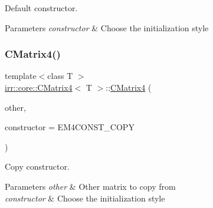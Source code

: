 Default constructor. 


\begin{DoxyParams}{Parameters}
{\em constructor} & Choose the initialization style \\
\hline
\end{DoxyParams}
\mbox{\label{classirr_1_1core_1_1CMatrix4_acdb7afc2248d97a7e882cd1bdeed07b7}} 
\subsubsection{\texorpdfstring{C\+Matrix4()}{CMatrix4()}\hspace{0.1cm}{\footnotesize\ttfamily [2/4]}}
{\footnotesize\ttfamily template$<$class T $>$ \\
\hyperlink{classirr_1_1core_1_1CMatrix4}{irr\+::core\+::\+C\+Matrix4}$<$ T $>$\+::\hyperlink{classirr_1_1core_1_1CMatrix4}{C\+Matrix4} (\begin{DoxyParamCaption}\item[{const \hyperlink{classirr_1_1core_1_1CMatrix4}{C\+Matrix4}$<$ T $>$ \&}]{other,  }\item[{\hyperlink{classirr_1_1core_1_1CMatrix4_a7bb79712227617f706ed57a34f3eb4fe}{e\+Constructor}}]{constructor = {\ttfamily EM4CONST\+\_\+COPY} }\end{DoxyParamCaption})\hspace{0.3cm}{\ttfamily [inline]}}



Copy constructor. 


\begin{DoxyParams}{Parameters}
{\em other} & Other matrix to copy from \\
\hline
{\em constructor} & Choose the initialization style \\
\hline
\end{DoxyParams}
\mbox{\label{classirr_1_1core_1_1CMatrix4_af771bfde63cdaa3baa4d9f6121e56411}} 
